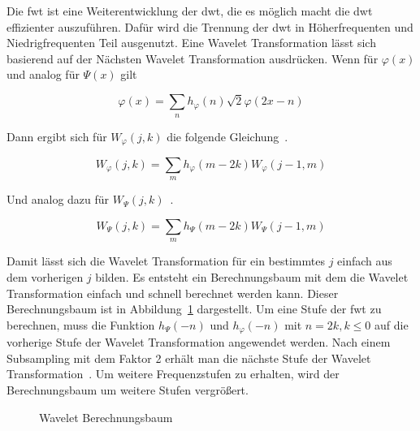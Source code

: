 \documentclass[12pt, a4paper, ngerman]{article}
\begin{document}
Die \ac{fwt} ist eine Weiterentwicklung der \ac{dwt},
die es möglich macht die \ac{dwt} effizienter auszuführen.
Dafür wird die Trennung der \ac{dwt} in Höherfrequenten
und Niedrigfrequenten Teil ausgenutzt.
Eine Wavelet Transformation lässt sich basierend
auf der Nächsten Wavelet Transformation ausdrücken.
Wenn für \(\varphi(x)\) und analog für \(\Psi(x)\) gilt

\[
  \varphi(x) = \sum_n h_{\varphi}(n)\sqrt{2}\varphi(2x-n)
\]

Dann ergibt sich für \(W_\varphi(j,k)\) die folgende Gleichung~\cite[S.11]{wavelet_analysis}.

\[
  W_\varphi(j,k)=\sum_m h_\varphi(m-2k)W_\varphi(j-1,m)
\]

Und analog dazu für \(W_\Psi(j,k)\)~\cite[S.11]{wavelet_analysis}.

\[
  W_\Psi(j,k)=\sum_m h_\Psi(m-2k)W_\Psi(j-1,m)
\]

Damit lässt sich die Wavelet Transformation für ein bestimmtes \(j\)
einfach aus dem vorherigen \(j\) bilden.
Es entsteht ein Berechnungsbaum mit dem die Wavelet Transformation
einfach und schnell berechnet werden kann.
Dieser Berechnungsbaum ist in Abbildung~\ref{fig:wavelet_tree} dargestellt.
Um eine Stufe der \ac{fwt} zu berechnen,
muss die Funktion \(h_\Psi(-n)\) und \(h_\varphi(-n)\) mit \(n=2k,k\leq 0\)
auf die vorherige Stufe der Wavelet Transformation angewendet werden.
Nach einem Subsampling mit dem Faktor 2 erhält man 
die nächste Stufe der Wavelet Transformation~\cite[S.12]{wavelet_analysis}.
Um weitere Frequenzstufen zu erhalten,
wird der Berechnungsbaum um weitere Stufen vergrößert.

\begin{figure}
  \centering
  \caption{Wavelet Berechnungsbaum}
  \label{fig:wavelet_tree}
\end{figure}
\end{document}
